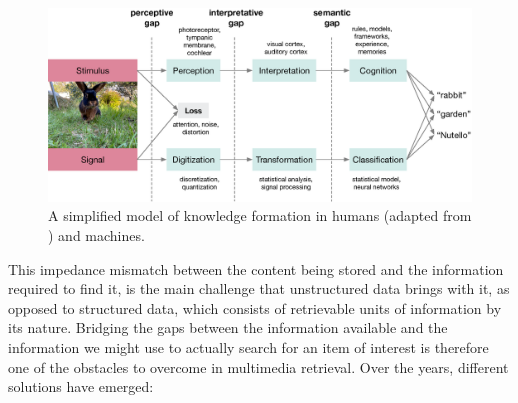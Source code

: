 \begin{figure}[tb]
    \centering
    \includegraphics[width=\textwidth]{figures/gaps.eps}
    \caption{A simplified model of knowledge formation in humans (adapted from \cite{Javanmardi:2021Exploring}) and machines.}
    \label{figure:knowledge_formation}
\end{figure}

This impedance mismatch between the content being stored and the information required to find it, is the main challenge that unstructured data brings with it, as opposed to structured data, which consists of retrievable units of information by its nature. Bridging the gaps between the information available and the information we might use to actually search for an item of interest is therefore one of the obstacles to overcome in multimedia retrieval. Over the years, different solutions have emerged:

